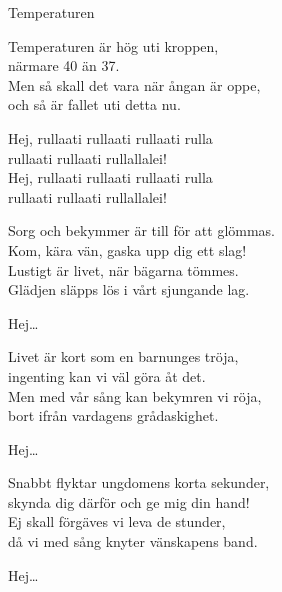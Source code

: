 \begin{song}{Temperaturen}


    \showversenumber	
	Temperaturen är hög uti kroppen,\\
	närmare 40 än 37.\\
	Men så skall det vara när ångan är oppe,\\
	och så är fallet uti detta nu.
	
	Hej, rullaati rullaati rullaati rulla\\
	rullaati rullaati rullallalei!\\
	Hej, rullaati rullaati rullaati rulla\\
	rullaati rullaati rullallalei!
	
    \showversenumber
	Sorg och bekymmer är till för att glömmas.\\
	Kom, kära vän, gaska upp dig ett slag!\\
	Lustigt är livet, när bägarna tömmes.\\
	Glädjen släpps lös i vårt sjungande lag.
	
	Hej\ldots{}
	
    \showversenumber
	Livet är kort som en barnunges tröja,\\
	ingenting kan vi väl göra åt det.\\
	Men med vår sång kan bekymren vi röja,\\
	bort ifrån vardagens grådaskighet.
	
	Hej\ldots{}
	
    \showversenumber
	Snabbt flyktar ungdomens korta sekunder,\\
	skynda dig därför och ge mig din hand!\\
	Ej skall förgäves vi leva de stunder,\\
	då vi med sång knyter vänskapens band.
	
	Hej\ldots{}
	
\end{song}
